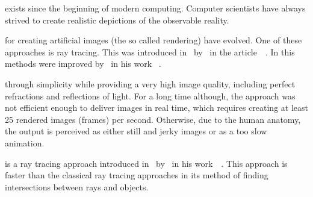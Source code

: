 \documentclass[%
    a4paper,    %
    justified,  %
    nobib,      %
    openany     %
]{tufte-book}
\begin{document}

 exists since the
beginning of modern computing. Computer scientists have always strived to create
realistic depictions of the observable reality.

 for creating artificial images (the so
called rendering) have evolved. One of these approaches is ray tracing. This was
introduced in~\citeyear{appel_techniques_1968}
by~\citeauthor{appel_techniques_1968} in the
article~~\cite{appel_techniques_1968}. In
\citeyear{whitted_improved_1980} this methods were improved
by~\citeauthor{whitted_improved_1980} in his work
~\cite{whitted_improved_1980}.

 through simplicity while providing a very
high image quality, including perfect refractions and reflections of light. For
a long time although, the approach was not efficient enough to deliver images in
real time, which requires creating at least 25 rendered images (frames) per
second. Otherwise, due to the human anatomy, the output is perceived as either
still and jerky images or as a too slow animation.

 is a ray tracing approach introduced
in~\citeyear{hart_sphere_1994} by~\citeauthor{hart_sphere_1994} in his
work~~\cite{hart_sphere_1994}. This approach is
faster than the classical ray tracing approaches in its method of finding
intersections between rays and objects.
\end{document}
